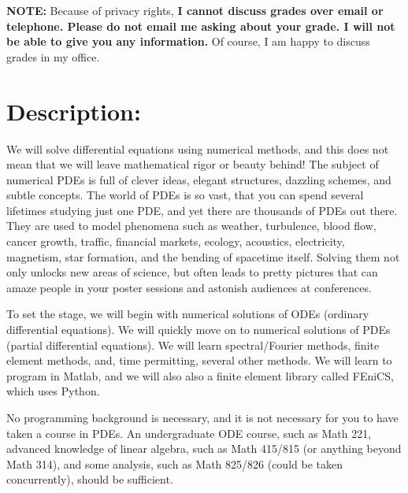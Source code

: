 \documentclass[margin]{res}
\theoremstyle{plain}
\theoremstyle{definition}
\theoremstyle{remark}
\begin{document}
\begin{resume}
\textbf{NOTE:} Because of privacy rights, \textbf{I cannot discuss grades over email or telephone. Please do not email me asking about your grade.  I will not be able to give you any information.}  Of course, I am happy to discuss grades in my office.

\section{Description:} We will solve differential equations using numerical methods, and this does not mean that we will leave mathematical rigor or beauty behind!  The subject of numerical PDEs is full of clever ideas, elegant structures, dazzling schemes, and subtle concepts.  The world of PDEs is so vast, that you can spend several lifetimes studying just one PDE, and yet there are thousands of PDEs out there.  They are used to model phenomena such as weather, turbulence, blood flow, cancer growth, traffic, financial markets, ecology, acoustics, electricity, magnetism, star formation, and the bending of spacetime itself.  Solving them not only unlocks new areas of science, but often leads to pretty pictures that can amaze people in your poster sessions and astonish audiences at conferences.

To set the stage, we will begin with numerical solutions of ODEs (ordinary differential equations).  We will quickly move on to numerical solutions of PDEs (partial differential equations).  We will learn spectral/Fourier methods, finite element methods, and, time permitting, several other methods.  We will learn to program in Matlab, and we will also also a finite element library called FEniCS, which uses Python.

No programming background is necessary, and it is not necessary for you to have taken a course in PDEs.  An undergraduate ODE course, such as Math 221, advanced knowledge of linear algebra, such as Math 415/815 (or anything beyond Math 314), and some analysis, such as Math 825/826 (could be taken concurrently), should be sufficient.




\end{resume}
\end{document}
